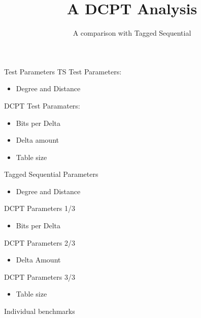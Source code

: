 \documentclass{beamer}
\title{A DCPT Analysis}
\subtitle{A comparison with Tagged Sequential}
\begin{document}
\maketitle

\begin{frame}{Test Parameters}
	TS Test Parameters:
	\begin{itemize}
		\item Degree and Distance
	\end{itemize}
	DCPT Test Paramaters:
	\begin{itemize}
		\item Bits per Delta
		\item Delta amount
		\item Table size
	\end{itemize}
\end{frame}

\begin{frame}{Tagged Sequential Parameters}
	\begin{itemize}
		\item Degree and Distance
	\end{itemize}
	
\end{frame}

\begin{frame}{DCPT Parameters 1/3}
	\begin{itemize}
		\item Bits per Delta
	\end{itemize}
	
\end{frame}

\begin{frame}{DCPT Parameters 2/3}
	\begin{itemize}
		\item Delta Amount
	\end{itemize}
	
\end{frame}

\begin{frame}{DCPT Parameters 3/3}
	\begin{itemize}
		\item Table size
	\end{itemize}
	
\end{frame}

\begin{frame}{Individual benchmarks}
	
\end{frame}
\end{document}
